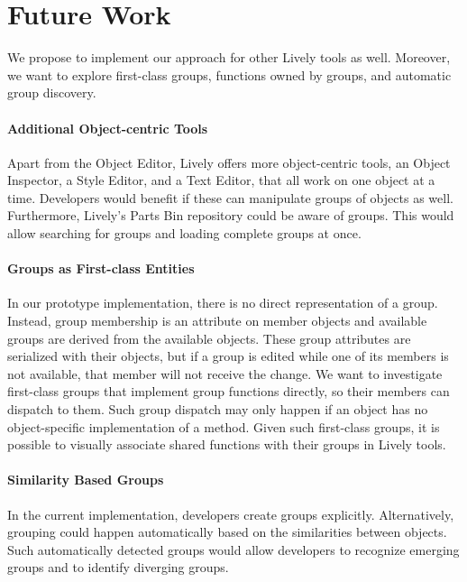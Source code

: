 \section{Future Work} \label{sec:FUTURE_WORK}

We propose to implement our approach for other Lively
tools as well. Moreover, we want to explore
first-class groups, functions owned by groups, and automatic group
discovery.

\paragraph{Additional Object-centric Tools}
Apart from the Object Editor, Lively offers more object-centric tools,
\eg an Object Inspector, a Style Editor, and a Text Editor, that all
work on one object at a time. Developers would benefit if these can
manipulate groups of objects as well. Furthermore, Lively's Parts Bin repository
could be aware of groups. This would allow searching for
groups and loading complete groups at once.

\paragraph{Groups as First-class Entities}
In our prototype implementation, there is no direct representation of
a group. Instead, group membership is an attribute on member objects
and available groups are derived from the available objects. These
group attributes are serialized with their objects, but if a group is
edited while one of its members is not available, that member will not
receive the change. We want to investigate first-class groups that
implement group functions directly, so their members can dispatch to
them. Such group dispatch may only happen if an object has no
object-specific implementation of a method. Given such first-class
groups, it is possible to visually associate shared functions with their groups
in Lively tools.

\paragraph{Similarity Based Groups}
In the current implementation, developers create groups
explicitly. Alternatively, grouping could happen automatically based
on the similarities between objects. Such automatically detected
groups would allow developers to recognize emerging groups and to
identify diverging groups.

